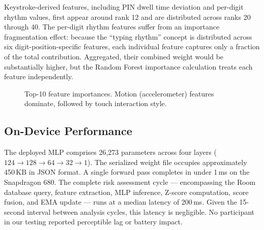 \documentclass[conference]{IEEEtran}
\begin{document}
Keystroke-derived features, including PIN dwell time deviation and per-digit rhythm values, first appear around rank 12 and are distributed across ranks 20 through 40. The per-digit rhythm features suffer from an importance fragmentation effect: because the ``typing rhythm'' concept is distributed across six digit-position-specific features, each individual feature captures only a fraction of the total contribution. Aggregated, their combined weight would be substantially higher, but the Random Forest importance calculation treats each feature independently.

\begin{figure}[htbp]
\centering
{}
\caption{Top-10 feature importances. Motion (accelerometer) features dominate, followed by touch interaction style.}
\label{fig:feature_importance}
\end{figure}

\subsection{On-Device Performance}

The deployed MLP comprises 26,273 parameters across four layers ($124 \to 128 \to 64 \to 32 \to 1$). The serialized weight file occupies approximately 450\,KB in JSON format. A single forward pass completes in under 1\,ms on the Snapdragon 680. The complete risk assessment cycle --- encompassing the Room database query, feature extraction, MLP inference, Z-score computation, score fusion, and EMA update --- runs at a median latency of 200\,ms. Given the 15-second interval between analysis cycles, this latency is negligible. No participant in our testing reported perceptible lag or battery impact.
\end{document}
